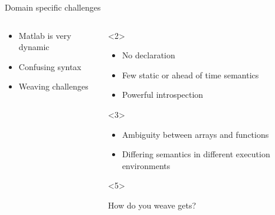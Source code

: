 \begin{frame}{Domain specific challenges}
  \begin{columns}
    \begin{column}{5cm}
      \begin{itemize}
      \item<alert@2> Matlab is very dynamic
      \item<alert@3> Confusing syntax
      \item<alert@4-> Weaving challenges
      \end{itemize}
    \end{column}
    \begin{column}{5cm}
      \begin{onlyenv}<2>
        \begin{block}{}
          \begin{itemize}
          \item No declaration 
          \item Few static or ahead of time semantics
          \item Powerful introspection
          \end{itemize}
        \end{block}
      \end{onlyenv}
      \begin{onlyenv}<3>
        \begin{block}{}
          \begin{itemize}
          \item Ambiguity between arrays and functions
          \item Differing semantics in different execution
            environments
          \end{itemize}
        \end{block}
      \end{onlyenv}
      \begin{onlyenv}<5>
        \begin{block}{}
          How do you weave gets?
        \end{block}
      \end{onlyenv}
    \end{column}
  \end{columns}
\end{frame}
